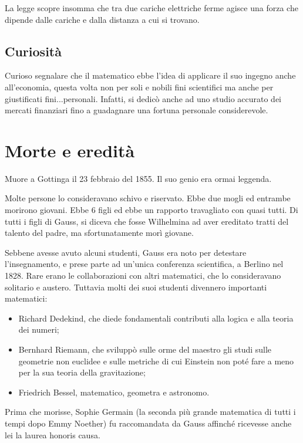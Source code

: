 La legge scopre insomma che tra due cariche elettriche ferme agisce una forza che dipende dalle cariche e dalla distanza a cui si trovano.

\subsection{Curiosità}

Curioso segnalare che il matematico ebbe l'idea di applicare il suo ingegno anche all'economia, questa volta non per soli e nobili fini scientifici ma anche per giustificati fini...personali. Infatti, si dedicò anche ad uno studio accurato dei mercati finanziari fino a guadagnare una fortuna personale considerevole.
\section{Morte e eredità}

Muore a Gottinga il 23 febbraio del 1855. Il suo genio era ormai leggenda.

\smallskip

Molte persone lo consideravano schivo e riservato. Ebbe due mogli ed entrambe morirono giovani. Ebbe 6 figli ed ebbe un rapporto travagliato con quasi tutti. Di tutti i figli di Gauss, si diceva che fosse Wilhelmina ad aver ereditato tratti del talento del padre, ma sfortunatamente morì giovane.

Sebbene avesse avuto alcuni studenti, Gauss era noto per detestare l'insegnamento, e prese parte ad un'unica conferenza scientifica, a Berlino nel 1828. Rare erano le collaborazioni con altri matematici, che lo consideravano solitario e austero. Tuttavia molti dei suoi studenti divennero importanti matematici:
\begin{itemize}
	\item Richard Dedekind, che diede fondamentali contributi alla logica e alla teoria dei numeri;
	\item Bernhard Riemann, che sviluppò sulle orme del maestro gli studi sulle geometrie non euclidee e sulle metriche di cui Einstein non poté fare a meno per la sua teoria della gravitazione;
	\item Friedrich Bessel, matematico, geometra e astronomo.
\end{itemize}
Prima che morisse, Sophie Germain (la seconda più grande matematica di tutti i tempi dopo Emmy Noether) fu raccomandata da Gauss affinché ricevesse anche lei la laurea honoris causa.

\bigskip

